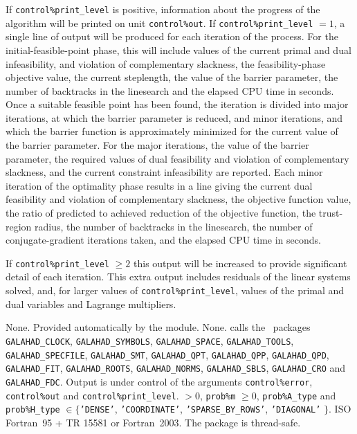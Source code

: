 \documentclass{galahad}
\newcommand{\packagename}{LPB}
\begin{document}

\galinfo
If {\tt control\%print\_level} is positive, information about the progress
of the algorithm will be printed on unit {\tt control\-\%out}.
If {\tt control\%print\_level} $= 1$, a single line of output will be produced
for each iteration of the process.
For the initial-feasible-point phase,
this will include values of the current primal and dual infeasibility, and
violation of complementary slackness, the feasibility-phase objective value,
the current steplength, the value of the barrier parameter, the
number of backtracks in the linesearch and the elapsed CPU time in seconds.
Once a suitable feasible point has been found, the iteration is divided
into major iterations, at which the barrier parameter is reduced, and
minor iterations, and which the barrier function is approximately minimized
for the current value of the barrier parameter. For the major iterations,
the value of the barrier parameter, the required values of
dual feasibility and violation of complementary slackness, and the current
constraint infeasibility are reported. Each minor iteration of the
optimality phase results in a line giving
the current dual feasibility and violation of complementary slackness, the
objective function value, the ratio of predicted to achieved reduction
of the objective function, the trust-region radius, the
number of backtracks in the linesearch, the number of conjugate-gradient
iterations taken, and the elapsed CPU time in seconds.

If {\tt control\%print\_level} $\geq 2$ this
output will be increased to provide significant detail of each iteration.
This extra output includes residuals of the linear systems solved, and,
for larger values of {\tt control\%print\_level}, values of the primal and dual
variables and Lagrange multipliers.


\galgeneral

\galcommon None.
\galworkspace Provided automatically by the module.
\galroutines None.
\galmodules {\tt \packagename\_solve} calls the \galahad\ packages
{\tt GALAHAD\_CLOCK},
{\tt GALAHAD\_SY\-M\-BOLS},
{\tt GALA\-HAD\_SPACE},
{\tt GAL\-AHAD\_TOOLS},
{\tt GALAHAD\_SPECFILE},
{\tt GALAHAD\_SMT},
{\tt GALAHAD\_QPT},
{\tt GALAHAD\_QPP},
{\tt GALAHAD\_QPD},
{\tt GALAHAD\_FIT},
{\tt GALAHAD\_ROOTS},
{\tt GALAHAD\_NORMS},
{\tt GALAHAD\_SBLS},
{\tt GALAHAD\_CRO}
and
{\tt GAL\-AHAD\_FDC}.
\galio Output is under control of the arguments
 {\tt control\%error}, {\tt control\%out} and {\tt control\%print\_level}.
 $> 0$, {\tt prob\%m} $\geq  0$,
{\tt prob\%A\_type} and {\tt prob\%H\_type} $\in \{${\tt 'DENSE'},
 {\tt 'COORDINATE'}, {\tt 'SPARSE\_BY\_\-ROWS'}, {\tt 'DIAGONAL'} $\}$.
\galportability ISO Fortran~95 + TR 15581 or Fortran~2003.
The package is thread-safe.
\end{document}
